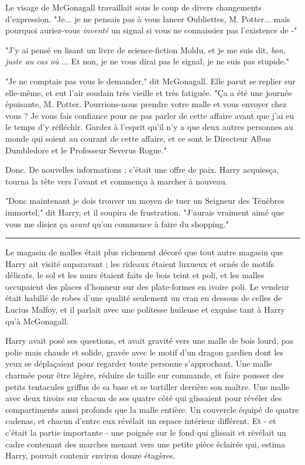 Le visage de McGonagall travaillait sous le coup de divers changements d'expression. "Je... je ne pensais pas à vous lancer Oubliettes, M. Potter... mais pourquoi auriez-vous \emph{inventé}  un signal si vous ne connaissiez pas l'existence de -"

"J'y ai pensé en lisant un livre de science-fiction Moldu, et je me suis dit, \emph{bon, juste au cas où} ... Et non, je ne vous dirai pas le signal, je ne suis pas stupide."

"Je ne comptais pas vous le demander," dit McGonagall. Elle parut se replier sur elle-même, et eut l'air soudain très vieille et très fatiguée. "Ça a été une journée épuisante, M. Potter. Pourrions-nous prendre votre malle et vous envoyer chez vous ? Je vous fais confiance pour ne pas parler de cette affaire avant que j'ai eu le temps d'y réfléchir. Gardez à l'esprit qu'il n'y a que deux autres personnes au monde qui soient au courant de cette affaire, et ce sont le Directeur Albus Dumbledore et le Professeur Severus Rogue."

Donc. De nouvelles informations ; c'était une offre de paix. Harry acquiesça, tourna la tête vers l'avant et commença à marcher à nouveau.

"Donc maintenant je dois trouver un moyen de tuer un Seigneur des Ténèbres immortel," dit Harry, et il soupira de frustration. "J'aurais vraiment aimé que vous me disiez ça \emph{avant}  qu'on commence à faire du shopping."
\par\noindent\rule{\textwidth}{0.4pt}
Le magasin de malles était plus richement décoré que tout autre magasin que Harry ait visité auparavant ; les rideaux étaient luxueux et ornés de motifs délicats, le sol et les murs étaient faits de bois teint et poli, et les malles occupaient des places d'honneur sur des plate-formes en ivoire poli. Le vendeur était habillé de robes d'une qualité seulement un cran en dessous de celles de Lucius Malfoy, et il parlait avec une politesse huileuse et exquise tant à Harry qu'à McGonagall.

Harry avait posé ses questions, et avait gravité vers une malle de bois lourd, pas polie mais chaude et solide, gravée avec le motif d'un dragon gardien dont les yeux se déplaçaient pour regarder toute personne s'approchant. Une malle charmée pour être légère, réduire de taille sur commande, et faire pousser des petits tentacules griffus de sa base et se tortiller derrière son maître. Une malle avec deux tiroirs sur chacun de ses quatre côté qui glissaient pour révéler des compartiments aussi profonds que la malle entière. Un couvercle équipé de quatre cadenas, et chacun d'entre eux révélait un espace intérieur différent. Et - et c'était la partie importante - une poignée sur le fond qui glissait et révélait un cadre contenant des marches menant vers une petite pièce éclairée qui, estima Harry, pouvait contenir environ douze étagères.

